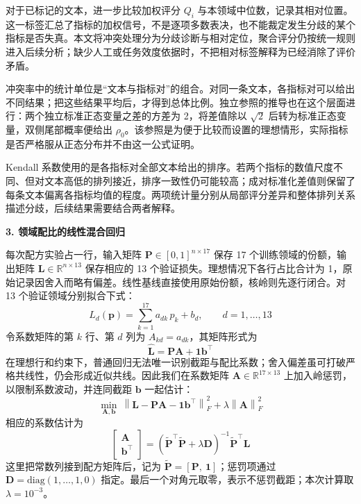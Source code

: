 对于已标记的文本，进一步比较加权评分 $Q_i$ 与本领域中位数，记录其相对位置。这一标签汇总了指标的加权信号，不是逐项多数表决，也不能裁定发生分歧的某个指标是否失真。本文将冲突处理分为分歧诊断与相对定位，聚合评分仍按统一规则进入后续分析；缺少人工或任务效度依据时，不把相对标签解释为已经消除了评价矛盾。

冲突率中的统计单位是“文本与指标对”的组合。对同一条文本，各指标对可以给出不同结果；把这些结果平均后，才得到总体比例。独立参照的推导也在这个层面进行：两个独立标准正态变量之差的方差为 2，将差值除以 $\sqrt2$ 后转为标准正态变量，双侧尾部概率便给出 $\rho_0$。该参照是为便于比较而设置的理想情形，实际指标是否严格服从正态分布并不由这一公式证明。

Kendall 系数使用的是各指标对全部文本给出的排序。若两个指标的数值尺度不同、但对文本高低的排列接近，排序一致性仍可能较高；成对标准化差值则保留了每条文本偏离各指标均值的程度。两项统计量分别从局部评分差异和整体排列关系描述分歧，后续结果需要结合两者解释。

\textbf{3. 领域配比的线性混合回归}\par\nopagebreak[4]

每次配方实验占一行，输入矩阵 $\bm P\in[0,1]^{n\times17}$ 保存 17 个训练领域的份额，输出矩阵 $\bm L\in\mathbb R^{n\times13}$ 保存相应的 13 个验证损失。理想情况下各行占比合计为 1，原始记录因舍入而略有偏差。线性基线直接使用原始份额，核岭则先逐行闭合。对 13 个验证领域分别拟合下式：
\begin{equation}
    L_{d}(\bm p) = \sum_{k=1}^{17} a_{dk}\, p_k + b_d,\qquad d=1,\dots,13
\end{equation}
令系数矩阵的第 $k$ 行、第 $d$ 列为 $A_{kd}=a_{dk}$，其矩阵形式为
\begin{equation}
    \hat{\bm L} = \bm P \bm A + \bm 1 \bm b^{\top}
\end{equation}
在理想行和约束下，普通回归无法唯一识别截距与配比系数；舍入偏差虽可打破严格共线性，仍会形成近似共线。因此我们在系数矩阵 $\bm A\in\mathbb R^{17\times13}$ 上加入岭惩罚\cite{hoerl1970ridge}，以限制系数波动，并连同截距 $\bm b$ 一起估计：
\begin{equation}
    \min_{\bm A,\bm b}\ \left\|\bm L-\bm P\bm A-\bm 1\bm b^{\top}\right\|_F^2 + \lambda\left\|\bm A\right\|_F^2
\end{equation}
相应的系数估计为
\begin{equation}
    \begin{bmatrix}\bm A\\ \bm b^{\top}\end{bmatrix}
    = \left(\tilde{\bm P}^{\top}\tilde{\bm P}+\lambda \bm D\right)^{-1}\tilde{\bm P}^{\top}\bm L
\end{equation}
这里把常数列接到配方矩阵后，记为 $\tilde{\bm P}=[\bm P,\ \bm 1]$；惩罚项通过 $\bm D=\mathrm{diag}(1,\dots,1,0)$ 指定。最后一个对角元取零，表示不惩罚截距；本次计算取 $\lambda=10^{-3}$。

